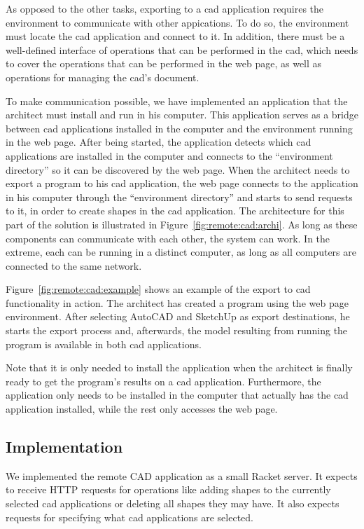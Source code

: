 As opposed to the other tasks, exporting to a \gls{cad} application requires the environment to communicate with other appications.
To do so, the environment must locate the \gls{cad} application and connect to it.
In addition, there must be a well-defined interface of operations that can be performed in the \gls{cad}, which needs to cover the operations that can be performed in the web page, as well as operations for managing the \gls{cad}'s document.

To make communication possible, we have implemented an application that the architect must install and run in his computer.
This application serves as a bridge between \gls{cad} applications installed in the computer and the environment running in the web page.
After being started, the application detects which \gls{cad} applications are installed in the computer and connects to the ``environment directory'' so it can be discovered by the web page.
When the architect needs to export a program to his \gls{cad} application, the web page connects to the application in his computer through the ``environment directory'' and starts to send requests to it, in order to create shapes in the \gls{cad} application.
The architecture for this part of the solution is illustrated in Figure~\ref{fig:remote:cad:archi}.
As long as these components can communicate with each other, the system can work.
In the extreme, each can be running in a distinct computer, as long as all computers are connected to the same network.

Figure~\ref{fig:remote:cad:example} shows an example of the export to \gls{cad} functionality in action.
The architect has created a program using the web page environment.
After selecting AutoCAD and SketchUp as export destinations, he starts the export process and, afterwards, the model resulting from running the program is available in both \gls{cad} applications.

Note that it is only needed to install the application when the architect is finally ready to get the program's results on a \gls{cad} application.
Furthermore, the application only needs to be installed in the computer that actually has the \gls{cad} application installed, while the rest only accesses the web page.


\subsection{Implementation}
We implemented the remote CAD application as a small Racket server.
It expects to receive HTTP requests for operations like adding shapes to the currently selected \gls{cad} applications or deleting all shapes they may have.
It also expects requests for specifying what \gls{cad} applications are selected.

